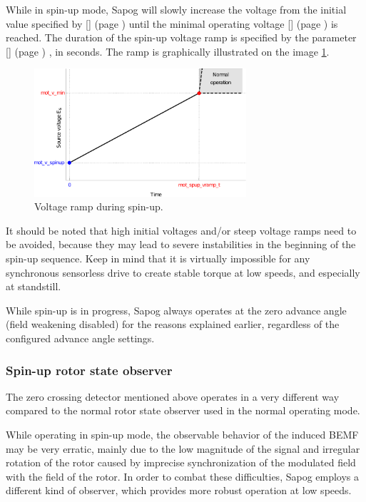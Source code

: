 \documentclass{zubaxdoc}
\newcommand{\CfgRef}[1]{
    \StrSubstitute{#1}{+}{\textunderscore}[\temp]
    \texttt{\temp} {\footnotesize (page \pageref{#1})}
}
\begin{document}
While in spin-up mode, Sapog will slowly increase the voltage from the initial value specified
by \CfgRef{mot+v+spinup} until the minimal operating voltage \CfgRef{mot+v+min} is reached.
The duration of the spin-up voltage ramp is specified by the parameter \CfgRef{mot+spup+vramp+t},
in seconds.
The ramp is graphically illustrated on the image \ref{spinup_voltage_ramp}.

\begin{figure}[hbt]
    \centering
	\includegraphics[width=0.7\textwidth]{spinup_voltage_ramp}
	\caption{Voltage ramp during spin-up.
	\label{spinup_voltage_ramp}}
\end{figure}

It should be noted that high initial voltages and/or steep voltage ramps need to be avoided,
because they may lead to severe instabilities in the beginning of the spin-up sequence.
Keep in mind that it is virtually impossible for any synchronous sensorless drive to create stable
torque at low speeds, and especially at standstill.

While spin-up is in progress, Sapog always operates at the zero advance angle
(field weakening disabled) for the reasons explained earlier,
regardless of the configured advance angle settings.

\subsubsection{Spin-up rotor state observer}

The zero crossing detector mentioned above operates in a very different way compared to the
normal rotor state observer used in the normal operating mode.

While operating in spin-up mode, the observable behavior of the induced BEMF may be very erratic,
mainly due to the low magnitude of the signal and irregular rotation of the rotor caused by
imprecise synchronization of the modulated field with the field of the rotor.
In order to combat these difficulties, Sapog employs a different kind of observer, which provides
more robust operation at low speeds.
\end{document}
